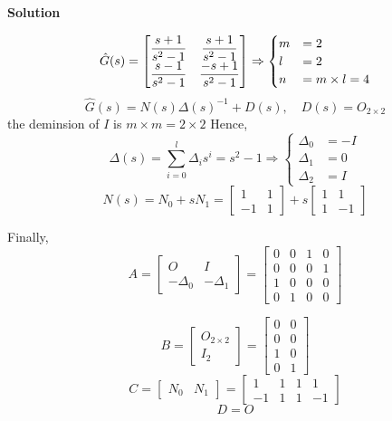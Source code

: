 \documentclass[12pt,a4paper]{article}
\begin{document}
\textbf{Solution}

\[
\hat G(s) = \begin{bmatrix}
	\displaystyle{ s+ 1 \over s^2 - 1} & \displaystyle{s + 1 \over s^2 - 1} \\
	\displaystyle{s - 1 \over s^2 - 1} & \displaystyle{-s + 1 \over s^2 -1}
\end{bmatrix}\Rightarrow \begin{cases}
m &= 2 \\
l &= 2 \\
n &= m \times l = 4
\end{cases}
\]
\[
\hat G(s) = N(s)\Delta(s)^{-1} + D(s), \quad D(s) = O_{2\times2}
\]
the deminsion of $I$ is $m \times m = 2 \times 2$
Hence, 
\[
\Delta(s) = \sum_{i = 0}^{l} \Delta_i s^i = s^2 - 1 \Rightarrow\begin{cases}
	\Delta_0 &= -I \\
	\Delta_1 &= 0 \\
	\Delta_2 &= I
\end{cases}
\]
\[
N(s) = N_0 + sN_1 = \begin{bmatrix}
	1 & 1 \\
	-1 & 1 
\end{bmatrix} + s\begin{bmatrix}
1 & 1 \\ 1 & -1
\end{bmatrix} 
\]

Finally, 
\[
A = \begin{bmatrix}
	O & I \\
	-\Delta_0 & -\Delta_1
\end{bmatrix} = \begin{bmatrix}
	0 & 0 & 1 & 0 \\
	0 & 0 & 0 & 1 \\
	1 & 0 & 0 & 0 \\
	0 & 1 & 0 & 0 
\end{bmatrix}
\]

\[B = \begin{bmatrix}
	O_{2\times2} \\ I_2
\end{bmatrix} = \begin{bmatrix}
	0 & 0 \\
	0 & 0 \\
	1 & 0 \\
	0 & 1
\end{bmatrix}
\]
\[
C = \begin{bmatrix}
	N_0 & N_1
\end{bmatrix} = \begin{bmatrix}
	1 & 1 & 1 & 1 \\
	-1 & 1 & 1 & -1
\end{bmatrix}
\]
\[
D = O
\]
\end{document}
